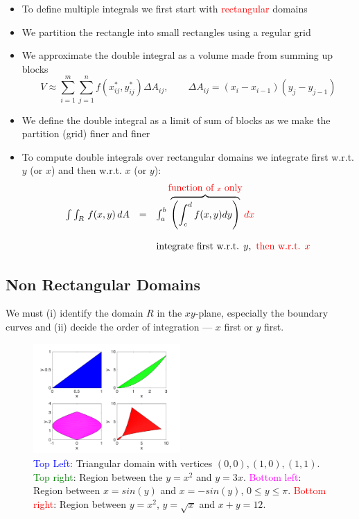 \documentclass{article}
\begin{document}
\begin{itemize}
\item
To define multiple integrals we first start with \textcolor{red}{rectangular} domains
\item
We partition the rectangle into small rectangles using a regular grid
\item
We approximate the double integral as a volume made from summing up blocks
$$
V \approx \sum_{i=1}^m \sum_{j=1}^n f(x_{ij}^{*},y_{ij}^*)\Delta A_{ij}, \qquad \Delta A_{ij} = (x_i-x_{i-1})(y_j - y_{j-1})
$$
\item
We define the double integral as a limit of sum of blocks as we make the partition (grid) finer and finer
\item
To compute double integrals over rectangular domains we integrate first w.r.t. $y$ (or $x$) and then w.r.t. $x$ (or $y$):
$$
\begin{array}{lll}
\int \int_R \, f(x,y) \, dA & = & \int_a^b \overbrace{\left( \int_c^d f(x,y) dy \right) }^{\textcolor{red}{\mbox{function of } { x} \mbox{  only}}}\textcolor{red}{dx}\\
\\
&& \mbox{integrate first w.r.t. } y, \textcolor{red}{\mbox{  then w.r.t. } x }
\end{array}
$$
\end{itemize}


\subsection{Non Rectangular Domains}

We must (i) identify the domain $R$ in the
$xy$-plane, especially the boundary curves and (ii) decide the order of integration --- $x$ first or $y$ first.
\begin{figure}[!ht]
\vspace{0.25cm}
\centering
\includegraphics[width = 0.5\textwidth]{Non_rect_doms.pdf}%
\vspace{-.3cm}
\caption{\textcolor{blue}{Top Left}: Triangular domain with vertices $(0,0), (1,0), (1,1)$. 
\textcolor{green}{Top right}: Region between the $y = x^2$ and $y=3x$. 
\textcolor{magenta}{Bottom left}: Region between $x = sin(y)$ and $x=-sin(y)$, $0 \leq y \leq \pi$.
\textcolor{red}{Bottom right}: Region between $y=x^2$, $y = \sqrt{x}$ and $x+y = 12$.}
\label{non_rect}%
\end{figure}
\vspace{.25cm}
\end{document}
